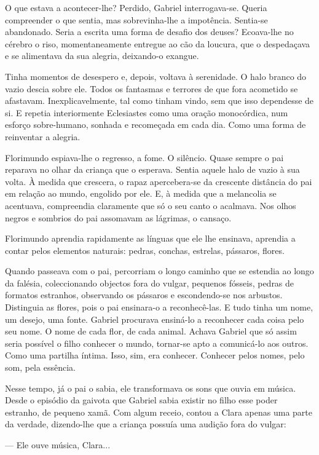 O que estava a acontecer-lhe? Perdido, Gabriel interrogava-se. Queria
compreender o que sentia, mas sobrevinha-lhe a impotência. Sentia-se
abandonado. Seria a escrita uma forma de desafio dos deuses? Ecoava-lhe
no cérebro o riso, momentaneamente entregue ao cão da loucura, que o
despedaçava e se alimentava da sua alegria, deixando-o exangue.

Tinha momentos de desespero e, depois, voltava à serenidade. O halo
branco do vazio descia sobre ele. Todos os fantasmas e terrores de que
fora acometido se afastavam. Inexplicavelmente, tal como tinham vindo,
sem que isso dependesse de si. E repetia interiormente Eclesiastes como
uma oração monocórdica, num esforço sobre-humano, sonhada e recomeçada
em cada dia. Como uma forma de reinventar a alegria.

Florimundo espiava-lhe o regresso, a fome. O silêncio. Quase sempre o
pai reparava no olhar da criança que o esperava. Sentia aquele halo de
vazio à sua volta. À medida que crescera, o rapaz apercebera-se da
crescente distância do pai em relação ao mundo, engolido por ele. E, à
medida que a melancolia se acentuava, compreendia claramente que só o
seu canto o acalmava. Nos olhos negros e sombrios do pai assomavam as
lágrimas, o cansaço.

Florimundo aprendia rapidamente as línguas que ele lhe ensinava,
aprendia a contar pelos elementos naturais: pedras, conchas, estrelas,
pássaros, flores.

Quando passeava com o pai, percorriam o longo caminho que se estendia ao
longo da falésia, coleccionando objectos fora do vulgar, pequenos
fósseis, pedras de formatos estranhos, observando os pássaros e
escondendo-se nos arbustos. Distinguia as flores, pois o pai ensinara-o
a reconhecê-las. E tudo tinha um nome, um desejo, uma fonte. Gabriel
procurava ensiná-lo a reconhecer cada coisa pelo seu nome. O nome de
cada flor, de cada animal. Achava Gabriel que só assim seria possível o
filho conhecer o mundo, tornar-se apto a comunicá-lo aos outros. Como
uma partilha íntima. Isso, sim, era conhecer. Conhecer pelos nomes, pelo
som, pela essência.

Nesse tempo, já o pai o sabia, ele transformava os sons que ouvia em
música. Desde o episódio da gaivota que Gabriel sabia existir no filho
esse poder estranho, de pequeno xamã. Com algum receio, contou a Clara
apenas uma parte da verdade, dizendo-lhe que a criança possuía uma
audição fora do vulgar:

--- Ele ouve música, Clara...

